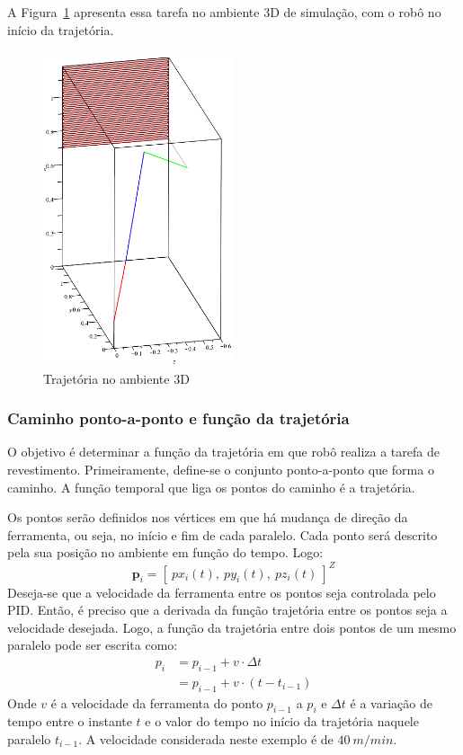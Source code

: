 A Figura~\ref{fig::trajec3D_600x500x10} apresenta essa tarefa no ambiente 3D
de simulação, com o robô no início da trajetória.

\begin{figure}[h!]
	\centering 
 	\includegraphics[width=0.50\textwidth]{figs/trajec3D_600x500x10}
 	\caption{Trajetória no ambiente 3D}
 	\label{fig::trajec3D_600x500x10}
\end{figure}

\subsubsection{Caminho ponto-a-ponto e função da trajetória}

O objetivo é determinar a função da trajetória em que robô realiza a tarefa de
revestimento. Primeiramente, define-se o conjunto ponto-a-ponto que forma o
caminho. A função temporal que liga os pontos do caminho é a trajetória.

Os pontos serão definidos nos vértices em que há mudança de direção da
ferramenta, ou seja, no início e fim de cada paralelo. Cada ponto será descrito
pela sua posição no ambiente em função do tempo. Logo:
%
\begin{equation} \label{eq::posi}
	\mathbf{p}_i = [~ px_{i}(t),~ py_{i}(t),~ pz_{i}(t)~]^Z
\end{equation}
%
Deseja-se que a velocidade da ferramenta entre os pontos seja controlada pelo
PID. Então, é preciso que a derivada da função trajetória entre os pontos seja a
velocidade desejada. Logo, a função da trajetória entre dois pontos de um mesmo
paralelo pode ser escrita como:
%
\begin{equation} \label{eq::pi}
\begin{split}
	p_i & = p_{i-1} + v \cdot \Delta t \\
		& = p_{i-1} + v \cdot (t-t_{i-1})
\end{split}
\end{equation}
%
Onde $v$ é a velocidade da ferramenta do ponto $p_{i-1}$ a $p_{i}$ e
$\Delta t$ é a variação de tempo entre o instante $t$ e o valor do tempo no
início da trajetória naquele paralelo $t_{i-1}$. A velocidade considerada neste
exemplo é de $40~m/min$.

